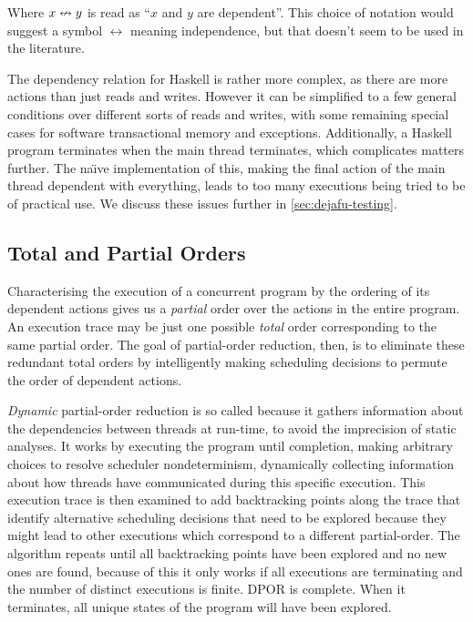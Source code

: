 Where $x \nleftrightarrow y$ is read as ``$x$ and $y$ are dependent''.  This
choice of notation would suggest a symbol $\leftrightarrow$ meaning
independence, but that doesn't seem to be used in the literature.

The dependency relation for Haskell is rather more complex, as there
are more actions than just reads and writes.  However it can be
simplified to a few general conditions over different sorts of reads
and writes, with some remaining special cases for software
transactional memory and exceptions.  Additionally, a Haskell program
terminates when the main thread terminates, which complicates matters
further.  The na\"{\i}ve implementation of this, making the final
action of the main thread dependent with everything, leads to too many
executions being tried to be of practical use.  We discuss these
issues further in \cref{sec:dejafu-testing}.

\subsection{Total and Partial Orders}

Characterising the execution of a concurrent program by the ordering of its
dependent actions gives us a \emph{partial} order over the actions in the entire
program.  An execution trace may be just one possible \emph{total} order
corresponding to the same partial order.  The goal of partial-order reduction,
then, is to eliminate these redundant total orders by intelligently making
scheduling decisions to permute the order of dependent actions.

\emph{Dynamic} partial-order reduction is so called because it gathers
information about the dependencies between threads at run-time, to
avoid the imprecision of static analyses\cite{flanagan2005}.  It works
by executing the program until completion, making arbitrary choices to
resolve scheduler nondeterminism, dynamically collecting information
about how threads have communicated during this specific execution.
This execution trace is then examined to add backtracking points along
the trace that identify alternative scheduling decisions that need to
be explored because they might lead to other executions which
correspond to a different partial-order.  The algorithm repeats until
all backtracking points have been explored and no new ones are found,
because of this it only works if all executions are terminating and
the number of distinct executions is finite.  DPOR is complete.  When
it terminates, all unique states of the program will have been
explored.

